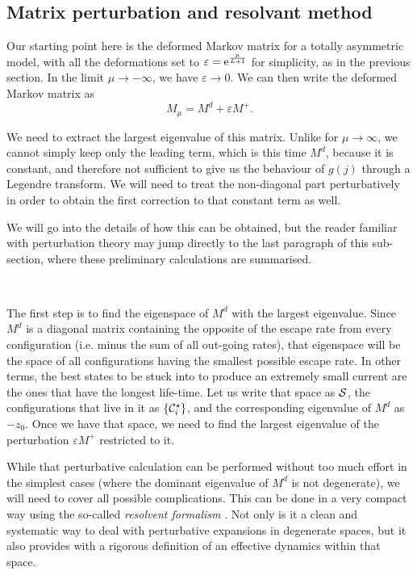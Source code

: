 \documentclass[aps,pre,onecolumn,showpacs,showkeys,a4paper]{revtex4-1}
\begin{document}
\subsection{Matrix perturbation and resolvant method}
\label{IVa}

Our starting point here is the deformed Markov matrix for a totally asymmetric model, with all the deformations set to $\varepsilon={\rm e}^{\frac{\mu}{L+1}}$ for simplicity, as in the previous section. In the limit $\mu\rightarrow-\infty$, we have $\varepsilon\rightarrow 0$. We can then write the deformed Markov matrix as
\begin{equation}
M_\mu=M^d+\varepsilon M^+.
\end{equation}

We need to extract the largest eigenvalue of this matrix. Unlike for $\mu\rightarrow\infty$, we cannot simply keep only the leading term, which is this time $M^d$, because it is constant, and therefore not sufficient to give us the behaviour of $g(j)$ through a Legendre transform. We will need to treat the non-diagonal part perturbatively in order to obtain the first correction to that constant term as well.

We will go into the details of how this can be obtained, but the reader familiar with perturbation theory may jump directly to the last paragraph of this sub-section, where these preliminary calculations are summarised.

~

The first step is to find the eigenspace of $M^d$ with the largest eigenvalue. Since $M^d$ is a diagonal matrix containing the opposite of the escape rate from every configuration (i.e. minus the sum of all out-going rates), that eigenspace will be the space of all configurations having the smallest possible escape rate. In other terms, the best states to be stuck into to produce an extremely small current are the ones that have the longest life-time.
Let us write that space as ${\cal S}$, the configurations that live in it as $\{{\cal C}_i^\star\}$, and the corresponding eigenvalue of $M^d$ as $-z_0$. Once we have that space, we need to find the largest eigenvalue of the perturbation $\varepsilon M^+$ restricted to it.



While that perturbative calculation can be performed without too much effort in the simplest cases (where the dominant eigenvalue of $M^d$ is not degenerate), we will need to cover all possible complications. This can be done in a very compact way using the so-called \textit{resolvent formalism} \cite{Fredholm1903}. Not only is it a clean and systematic way to deal with perturbative expansions in degenerate spaces, but it also provides with a rigorous definition of an effective dynamics within that space.
\end{document}
